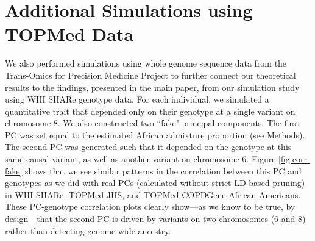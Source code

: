 \documentclass[12pt]{article}
\begin{document}


\section{Additional Simulations using  TOPMed Data}
\label{sec:topmedsims}

We also performed simulations using whole genome sequence data from the Trans-Omics for Precision Medicine Project to further connect our theoretical results to the findings, presented in the main paper, from our simulation study using WHI SHARe genotype data.
For each individual, we simulated a quantitative trait that depended only on their genotype at a single variant on chromosome 8. 
We also constructed two ``fake" principal components.
The first PC was set equal to the estimated African admixture proportion (see Methods). 
The second PC was generated such that it depended on the genotype at this same causal variant, as well as another variant on chromosome 6.
Figure \ref{fig:corr-fake} shows that we see similar patterns in the correlation between this PC and genotypes as we did with real PCs (calculated without strict LD-based pruning) in WHI SHARe, TOPMed JHS, and TOPMed COPDGene African Americans. 
These PC-genotype correlation plots clearly show---as we know to be true, by design---that the second PC is driven by variants on two chromosomes (6 and 8) rather than detecting genome-wide ancestry. 
\end{document}
